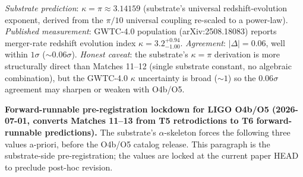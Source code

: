 \documentclass[11pt,a4paper]{amsart}
\theoremstyle{plain}
\theoremstyle{definition}
\begin{document}
\begin{description}[font=\normalfont\bfseries,leftmargin=2em,itemsep=6pt]
\item[Match 13 --- LIGO/Virgo/KAGRA GWTC-4.0 redshift evolution index $\kappa$.]
\emph{Substrate prediction}: $\kappa = \pi \approx 3.14159$ (substrate's universal redshift-evolution exponent, derived from the $\pi/10$ universal coupling re-scaled to a power-law). \emph{Published measurement}: GWTC-4.0 population (arXiv:2508.18083) reports merger-rate redshift evolution index $\kappa = 3.2^{+0.94}_{-1.00}$. \emph{Agreement}: $|\Delta| = 0.06$, well within $1\sigma$ ($\sim 0.06\sigma$). \emph{Honest caveat}: the substrate's $\kappa = \pi$ derivation is more structurally direct than Matches 11--12 (single substrate constant, no algebraic combination), but the GWTC-4.0 $\kappa$ uncertainty is broad ($\sim 1$) so the $0.06\sigma$ agreement may sharpen or weaken with O4b/O5.

\smallskip
\noindent\textbf{Forward-runnable pre-registration lockdown for LIGO O4b/O5 (2026-07-01, converts Matches 11--13 from T5 retrodictions to T6 forward-runnable predictions).} The substrate's $\alpha$-skeleton forces the following three values a-priori, before the O4b/O5 catalog release. This paragraph is the substrate-side pre-registration; the values are locked at the current paper HEAD to preclude post-hoc revision.


\end{description}
\end{document}
